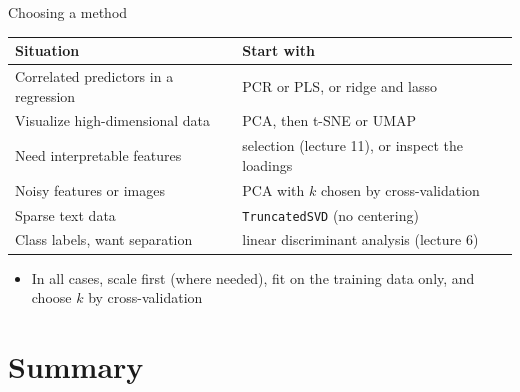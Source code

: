 \begin{frame}{Choosing a method}
    \centering
    \footnotesize
    \begin{tabular}{@{}l l@{}}
        \toprule
        Situation & Start with \\
        \midrule
        Correlated predictors in a regression & PCR or PLS, or ridge and lasso \\
        Visualize high-dimensional data & PCA, then t-SNE or UMAP \\
        Need interpretable features & selection (lecture 11), or inspect the loadings \\
        Noisy features or images & PCA with $k$ chosen by cross-validation \\
        Sparse text data & \texttt{TruncatedSVD} (no centering) \\
        Class labels, want separation & linear discriminant analysis (lecture 6) \\
        \bottomrule
    \end{tabular}

    \svspace{0.8em}
    \raggedright
    \begin{itemize}
        \item In all cases, scale first (where needed), fit on the training data only, and choose $k$ by cross-validation
    \end{itemize}
\end{frame}


\section{Summary}


